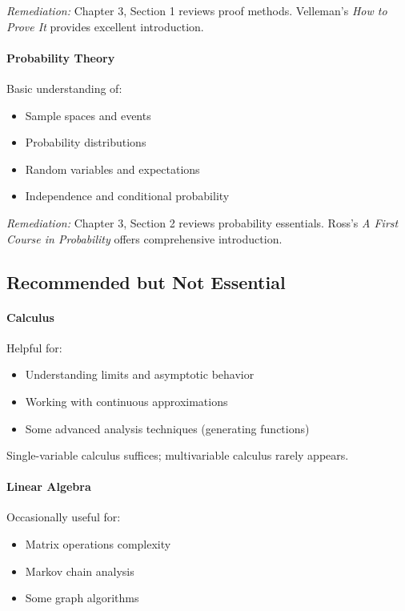 \textit{Remediation:} Chapter 3, Section 1 reviews proof methods. Velleman's \textit{How to Prove It} provides excellent introduction.

\paragraph{Probability Theory}
Basic understanding of:
\begin{itemize}
    \item Sample spaces and events
    \item Probability distributions
    \item Random variables and expectations
    \item Independence and conditional probability
\end{itemize}

\textit{Remediation:} Chapter 3, Section 2 reviews probability essentials. Ross's \textit{A First Course in Probability} offers comprehensive introduction.

\subsection{Recommended but Not Essential}

\paragraph{Calculus}
Helpful for:
\begin{itemize}
    \item Understanding limits and asymptotic behavior
    \item Working with continuous approximations
    \item Some advanced analysis techniques (generating functions)
\end{itemize}

Single-variable calculus suffices; multivariable calculus rarely appears.

\paragraph{Linear Algebra}
Occasionally useful for:
\begin{itemize}
    \item Matrix operations complexity
    \item Markov chain analysis
    \item Some graph algorithms
\end{itemize}


